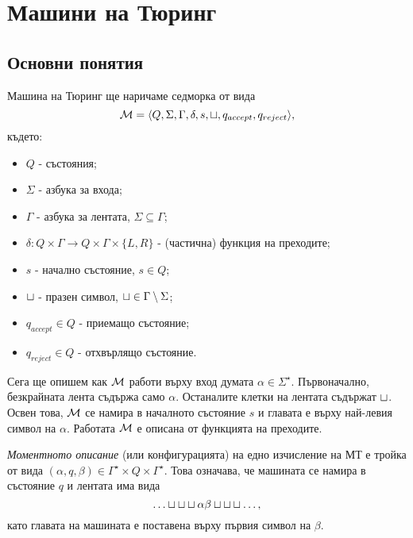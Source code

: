 \chapter{Машини на Тюринг}

\newcommand{\tape}[1]{\dots\blank\blank\blank{#1}\blank\blank\blank\dots}

\section{Основни понятия}
Машина на Тюринг ще наричаме седморка от вида 
\[\mathcal{M} = \langle{Q,\Sigma,\Gamma,\delta,s,\sqcup,q_{accept}, q_{reject}}\rangle,\] където:
\begin{itemize}
\item 
  $Q$ - състояния;
\item
  $\Sigma$ - азбука за входа;
\item
  $\Gamma$ - азбука за лентата, $\Sigma \subseteq \Gamma$;
\item
  $\delta:Q\times\Gamma \to Q\times \Gamma \times \{L,R\}$ - (частична) функция на преходите;
\item
  $s$ - начално състояние, $s \in Q$;
\item
  $\sqcup$ - празен символ,  $\sqcup \in \Gamma \setminus \Sigma$;
\item
  $q_{accept} \in Q$ - приемащо състояние;
\item
  $q_{reject} \in Q$ - отхвърлящо състояние.
\end{itemize}

Сега ще опишем как $\mathcal{M}$ работи върху вход думата $\alpha \in \Sigma^\star$.
Първоначално, безкрайната лента съдържа само $\alpha$. Останалите клетки на лентата съдържат $\sqcup$.
Освен това, $\mathcal{M}$ се намира в началното състояние $s$ и главата е върху най-левия символ на $\alpha$.
Работата $\mathcal{M}$ е описана от функцията на преходите.
  
{\em Моментното описание} (или конфигурацията) на едно изчисление на МТ е тройка от вида $(\alpha, q, \beta) \in \Gamma^\star\times Q \times \Gamma^\star$. Това означава, че
машината се намира в състояние $q$ и лентата има вида
\[\tape{\alpha\beta},\]
като главата на машината е поставена върху първия символ на $\beta$.

